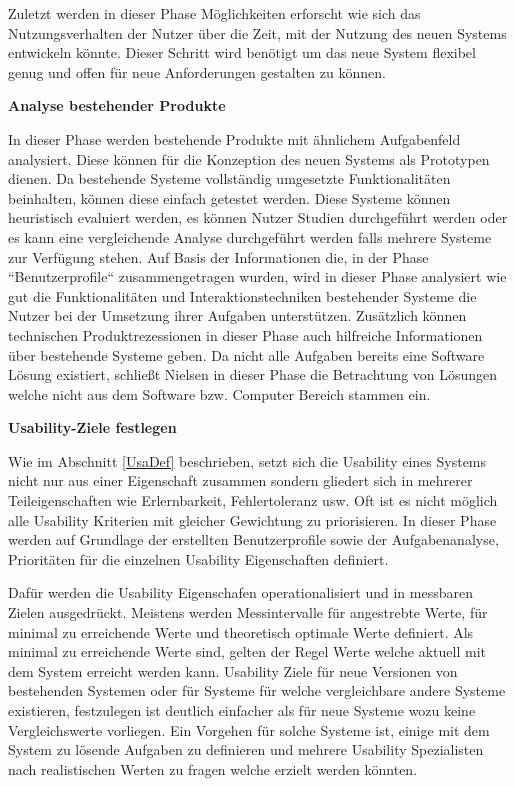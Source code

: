 \cite[S.~78]{Nielsen1994} Zuletzt werden in dieser Phase Möglichkeiten erforscht wie sich das Nutzungsverhalten der Nutzer über die Zeit, mit der Nutzung des neuen Systems entwickeln könnte. Dieser Schritt wird  
benötigt um das neue System flexibel genug und offen für neue Anforderungen gestalten zu können. 

\vspace{5mm} 
\textbf{Analyse bestehender Produkte} 
 
\cite[S.~78]{Nielsen1994} In dieser Phase werden bestehende Produkte mit ähnlichem Aufgabenfeld analysiert. Diese können für die Konzeption des neuen Systems als Prototypen dienen. 
Da bestehende Systeme vollständig umgesetzte Funktionalitäten beinhalten, können diese einfach getestet werden.    
Diese Systeme können heuristisch evaluiert werden, es können Nutzer Studien durchgeführt werden oder es kann eine vergleichende Analyse durchgeführt werden falls mehrere Systeme zur 
Verfügung stehen. Auf Basis der Informationen die, in der Phase ``Benutzerprofile`` zusammengetragen wurden, wird in dieser Phase analysiert wie gut die Funktionalitäten und Interaktionstechniken 
bestehender Systeme die Nutzer bei der Umsetzung ihrer Aufgaben unterstützen. Zusätzlich können technischen Produktrezessionen in dieser Phase auch hilfreiche Informationen über bestehende Systeme geben. 
Da nicht alle Aufgaben bereits eine Software Lösung existiert, schließt Nielsen in dieser Phase die Betrachtung von Lösungen welche nicht aus dem Software bzw. Computer Bereich stammen ein. 

\vspace{5mm} 
\textbf{Usability-Ziele festlegen} 

Wie im Abschnitt \ref{UsaDef} beschrieben, setzt sich die Usability eines Systems nicht nur aus einer Eigenschaft zusammen sondern gliedert sich in mehrerer Teileigenschaften wie Erlernbarkeit, Fehlertoleranz usw. \cite[S.~79]{Nielsen1994} Oft ist es nicht möglich alle Usability Kriterien mit gleicher Gewichtung zu priorisieren. In dieser Phase werden auf Grundlage der erstellten Benutzerprofile sowie der Aufgabenanalyse, Prioritäten für die einzelnen Usability Eigenschaften definiert. 

Dafür werden die Usability Eigenschafen operationalisiert und in messbaren Zielen ausgedrückt. Meistens werden Messintervalle für angestrebte Werte, für minimal zu erreichende Werte und theoretisch optimale Werte definiert. Als minimal zu erreichende Werte sind, gelten der Regel Werte welche aktuell mit dem System erreicht werden kann. Usability Ziele für neue Versionen von bestehenden Systemen oder für Systeme für welche vergleichbare andere Systeme existieren, festzulegen ist deutlich einfacher als für neue Systeme wozu keine Vergleichswerte vorliegen. Ein Vorgehen für solche Systeme ist, einige mit dem System zu lösende Aufgaben zu definieren und mehrere Usability Spezialisten nach realistischen Werten zu fragen welche erzielt werden könnten.

